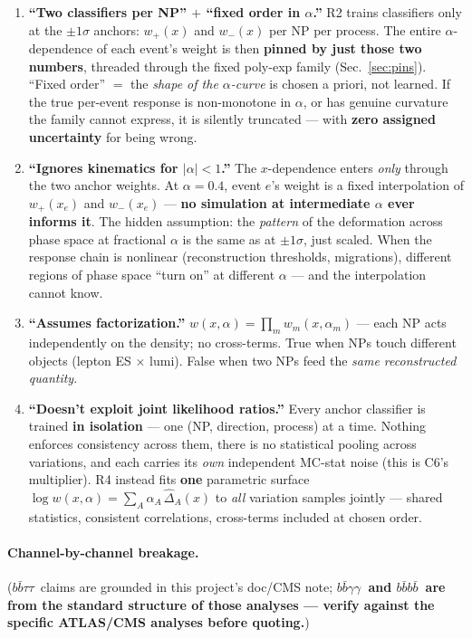 \documentclass[11pt]{article}
\newcommand{\bbtt}{\ensuremath{b\bar b\tau\tau}}
\newcommand{\bbgg}{\ensuremath{b\bar b\gamma\gamma}}
\newcommand{\fourb}{\ensuremath{b\bar bb\bar b}}
\begin{document}
\begin{enumerate}
\item \textbf{``Two classifiers per NP'' $+$ ``fixed order in $\alpha$.''} R2 trains classifiers only at the
  $\pm1\sigma$ anchors: $w_+(x)$ and $w_-(x)$ per NP per process. The entire $\alpha$-dependence of each
  event's weight is then \textbf{pinned by just those two numbers}, threaded through the fixed poly-exp family
  (Sec.~\ref{sec:pins}). ``Fixed order'' $=$ the \emph{shape of the $\alpha$-curve} is chosen a priori, not
  learned. If the true per-event response is non-monotone in $\alpha$, or has genuine curvature the family
  cannot express, it is silently truncated --- with \textbf{zero assigned uncertainty} for being wrong.
\item \textbf{``Ignores kinematics for $|\alpha|<1$.''} The $x$-dependence enters \emph{only} through the two
  anchor weights. At $\alpha=0.4$, event $e$'s weight is a fixed interpolation of $w_+(x_e)$ and $w_-(x_e)$ ---
  \textbf{no simulation at intermediate $\alpha$ ever informs it}. The hidden assumption: the \emph{pattern} of
  the deformation across phase space at fractional $\alpha$ is the same as at $\pm1\sigma$, just scaled. When
  the response chain is nonlinear (reconstruction thresholds, migrations), different regions of phase space
  ``turn on'' at different $\alpha$ --- and the interpolation cannot know.
\item \textbf{``Assumes factorization.''} $w(x,\alpha)=\prod_m w_m(x,\alpha_m)$ --- each NP acts independently
  on the density; no cross-terms. True when NPs touch different objects (lepton ES $\times$ lumi). False when
  two NPs feed the \emph{same reconstructed quantity}.
\item \textbf{``Doesn't exploit joint likelihood ratios.''} Every anchor classifier is trained \textbf{in
  isolation} --- one (NP, direction, process) at a time. Nothing enforces consistency across them, there is no
  statistical pooling across variations, and each carries its \emph{own} independent MC-stat noise (this is
  C6's multiplier). R4 instead fits \textbf{one} parametric surface
  $\log w(x,\alpha)=\sum_A\alpha_A\,\hat\Delta_A(x)$ to \emph{all} variation samples jointly --- shared
  statistics, consistent correlations, cross-terms included at chosen order.
\end{enumerate}

\paragraph{Channel-by-channel breakage.} (\bbtt\ claims are grounded in this project's doc/CMS note;
\textbf{\bbgg\ and \fourb\ are from the standard structure of those analyses --- verify against the specific
ATLAS/CMS analyses before quoting.})
\end{document}
